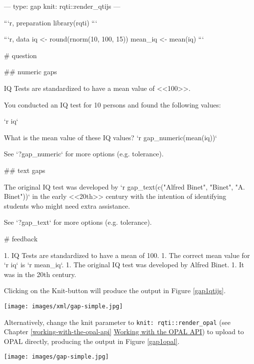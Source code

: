 \documentclass[twoside]{tufte-book}
\newenvironment{Shaded}{}{}
\begin{document}
\begin{Shaded}
\begin{Highlighting}
---
type: gap
knit: rqti::render_qtijs
---

```{r, preparation}
library(rqti)
```

```{r, data}
iq <- round(rnorm(10, 100, 15))
mean_iq <- mean(iq)
```

# question

## numeric gaps

IQ Tests are standardized to have a mean value of <<100>>.

You conducted an IQ test for 10 persons and found the following values: 

`r iq`

What is the mean value of these IQ values? `r gap_numeric(mean(iq))`

See `?gap_numeric` for more options (e.g. tolerance).

## text gaps

The original IQ test was developed by `r gap_text(c("Alfred Binet", "Binet", "A.
Binet"))` in the early <<20th>> century with the intention of identifying
students who might need extra assistance.

See `?gap_text` for more options (e.g. tolerance).

# feedback

1. IQ Tests are standardized to have a mean of 100.
1. The correct mean value for `r iq` is `r mean_iq`.
1. The original IQ test was developed by Alfred Binet.
1. It was in the 20th century.
\end{Highlighting}
\end{Shaded}

Clicking on the Knit-button will produce the output in Figure \ref{gap1qtijs}.

\begin{figure*}
\centering
\texttt{[image: images/xml/gap-simple.jpg]}
\caption{\label{gap1qtijs}Simple gap task rendered in qtijs}
\end{figure*}

\noindent Alternatively, change the knit parameter to \texttt{knit:\ rqti::render\_opal} (see Chapter \ref{working-with-the-opal-api} \href{api_opal.html}{Working with the OPAL API}) to upload to OPAL directly, producing the output in Figure \ref{gap1opal}.

\begin{figure*}
\centering
\texttt{[image: images/gap-simple.jpg]}
\caption{\label{gap1opal}Simple gap task rendered in OPAL}
\end{figure*}
\end{document}
